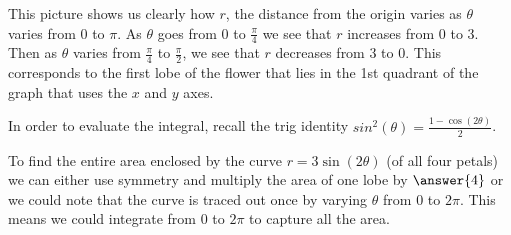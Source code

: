\documentclass{ximera}
\begin{document}
\begin{exercise}
\begin{hint}
This picture shows us clearly how $r$, the distance from the origin varies as $\theta$ varies from $0$ to $\pi$. As $\theta$ goes from $0$ to $\frac{\pi}{4}$ we see that $r$ increases from $0$ to $3$. Then as $\theta$ varies from $\frac{\pi}{4}$ to $\frac{\pi}{2}$, we see that $r$ decreases from $3$ to $0$. This corresponds to the first lobe of the flower that lies in the 1st quadrant of the graph that uses the $x$ and $y$ axes. 


In order to evaluate the integral, recall the trig identity $sin^2(\theta)=\frac{1-\cos(2\theta)}{2}$. 


To find the entire area enclosed by the curve $r=3\sin(2\theta)$  (of all four petals) we can either use symmetry and multiply the area of one lobe by $\answer{4}$ or
we could note that the curve is traced out once by varying $\theta$ from $0$ to $2\pi$. 
This means we could integrate from $0$ to $2\pi$ to capture all the area. 







\end{hint}

\end{exercise}
\end{document}
